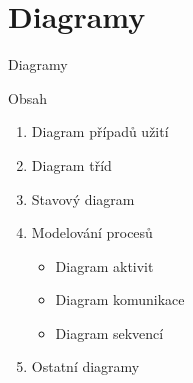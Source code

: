 \section{Diagramy}



\begin{frame}{Diagramy}

\onslide<+-> Obsah

\begin{enumerate}
	\item Diagram případů užití
	\item Diagram tříd 
	\item Stavový diagram 
	\item Modelování procesů
	\begin{itemize}
		\item Diagram aktivit
		\item Diagram komunikace
		\item Diagram sekvencí
	\end{itemize}
	\item Ostatní diagramy
\end{enumerate}

\end{frame}


	
	
	
	
	
